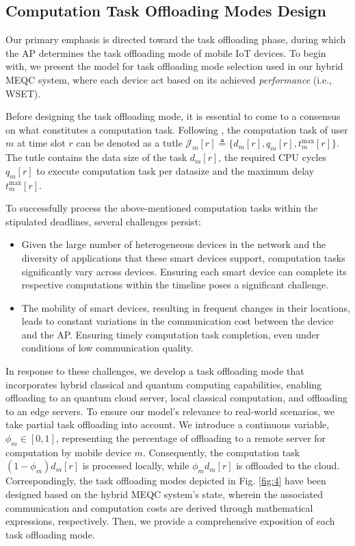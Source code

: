 \documentclass[journal]{IEEEtran}
\begin{document}
\subsection{Computation Task Offloading Modes Design}
Our primary emphasis is directed toward the task offloading phase, during which the AP determines the task offloading mode of mobile IoT devices.
To begin with, we present the model for task offloading mode selection used in our hybrid MEQC system, where each device act based on its achieved {\em performance} (i.e., WSET).


Before designing the task offloading mode, it is essential to come to a consensus on what constitutes a computation task.
Following \cite{ngoenriang2022optimal}, the computation task of user $m$ at time slot $r$ can be denoted as a tutle $\mathcal{J}_m[r] \triangleq \{d_m[r], q_m[r], t_m^{\max}[r]\}$.
The tutle contains the data size of the task $d_m[r]$, the required CPU cycles $q_m[r]$ to execute computation task per datasize and the maximum delay $t_m^{\max}[r]$.

To successfully process the above-mentioned computation tasks within the stipulated deadlines, several challenges persist:
\begin{itemize}
    \item {Given the large number of heterogeneous devices in the network and the diversity of applications that these smart devices support, computation tasks significantly vary across devices. Ensuring each smart device can complete its respective computations within the timeline poses a significant challenge.}
    \item {The mobility of smart devices, resulting in frequent changes in their locations, leads to constant variations in the communication cost between the device and the AP.
    Ensuring timely computation task completion, even under conditions of low communication quality.}
\end{itemize}
In response to these challenges, we develop a task offloading mode that incorporates hybrid classical and quantum computing capabilities, enabling offloading to an quantum cloud server, local classical computation, and offloading to an edge servers.
To ensure our model's relevance to real-world scenarios, we take partial task offloading into account.
We introduce a continuous variable, $\phi_m\in[0,1]$,  representing the percentage of offloading to a remote server for computation by mobile device $m$.
Consequently, the computation task $(1-\phi_m)d_m[r]$ is processed locally, while $\phi_md_m[r]$ is offloaded to the cloud.
Correspondingly, the task offloading modes depicted in Fig. \ref{fig:4} have been designed based on the hybrid MEQC system's state, wherein the associated communication and computation costs are derived through mathematical expressions, respectively.
Then, we provide a comprehensive exposition of each task offloading mode.
\end{document}
